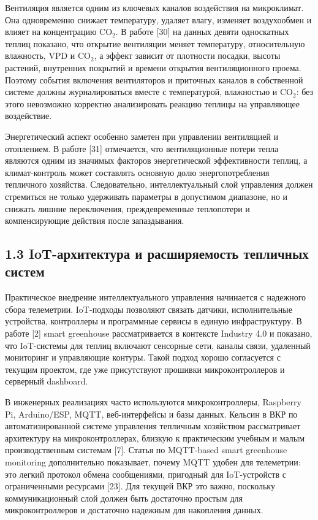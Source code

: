 \documentclass[a4paper,14pt]{extarticle}
\begin{document}
Вентиляция является одним из ключевых каналов воздействия на
микроклимат. Она одновременно снижает температуру, удаляет влагу,
изменяет воздухообмен и влияет на концентрацию CO\(_2\). В работе
{[}30{]} на данных девяти односкатных теплиц показано, что открытие
вентиляции меняет температуру, относительную влажность, VPD и CO\(_2\),
а эффект зависит от плотности посадки, высоты растений, внутренних
покрытий и времени открытия вентиляционного проема. Поэтому события
включения вентиляторов и приточных каналов в собственной системе должны
журналироваться вместе с температурой, влажностью и CO\(_2\): без этого
невозможно корректно анализировать реакцию теплицы на управляющее
воздействие.

Энергетический аспект особенно заметен при управлении вентиляцией и
отоплением. В работе {[}31{]} отмечается, что вентиляционные потери
тепла являются одним из значимых факторов энергетической эффективности
теплиц, а климат-контроль может составлять основную долю
энергопотребления тепличного хозяйства. Следовательно, интеллектуальный
слой управления должен стремиться не только удерживать параметры в
допустимом диапазоне, но и снижать лишние переключения, преждевременные
теплопотери и компенсирующие действия после запаздывания.

\hypertarget{iot-ux430ux440ux445ux438ux442ux435ux43aux442ux443ux440ux430-ux438-ux440ux430ux441ux448ux438ux440ux44fux435ux43cux43eux441ux442ux44c-ux442ux435ux43fux43bux438ux447ux43dux44bux445-ux441ux438ux441ux442ux435ux43c}{%
\subsection{1.3 IoT-архитектура и расширяемость тепличных
систем}\label{iot-ux430ux440ux445ux438ux442ux435ux43aux442ux443ux440ux430-ux438-ux440ux430ux441ux448ux438ux440ux44fux435ux43cux43eux441ux442ux44c-ux442ux435ux43fux43bux438ux447ux43dux44bux445-ux441ux438ux441ux442ux435ux43c}}

Практическое внедрение интеллектуального управления начинается с
надежного сбора телеметрии. IoT-подходы позволяют связать датчики,
исполнительные устройства, контроллеры и программные сервисы в единую
инфраструктуру. В работе {[}2{]} smart greenhouse рассматривается в
контексте Industry 4.0 и показано, что IoT-системы для теплиц включают
сенсорные сети, каналы связи, удаленный мониторинг и управляющие
контуры. Такой подход хорошо согласуется с текущим проектом, где уже
присутствуют прошивки микроконтроллеров и серверный dashboard.

В инженерных реализациях часто используются микроконтроллеры, Raspberry
Pi, Arduino/ESP, MQTT, веб-интерфейсы и базы данных. Кельсин в ВКР по
автоматизированной системе управления тепличным хозяйством рассматривает
архитектуру на микроконтроллерах, близкую к практическим учебным и малым
производственным системам {[}7{]}. Статья по MQTT-based smart greenhouse
monitoring дополнительно показывает, почему MQTT удобен для телеметрии:
это легкий протокол обмена сообщениями, пригодный для IoT-устройств с
ограниченными ресурсами {[}23{]}. Для текущей ВКР это важно, поскольку
коммуникационный слой должен быть достаточно простым для
микроконтроллеров и достаточно надежным для накопления данных.
\end{document}
